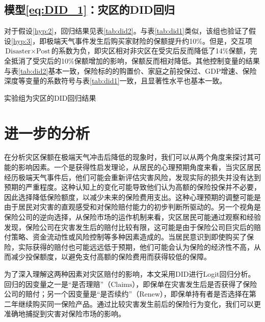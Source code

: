 
\subsection{模型\ref{eq:DID_1}：灾区的DID回归}
对于假设\ref{hyp:2}，回归结果见表\ref{tab:did2}。与表\ref{tab:did1}类似，该组也验证了假设\ref{hyp:3}，即极端天气事件发生后购买家财险的保额提升约10\%。但是，交互项$\text{Disaster}\times \text{Post}$的系数为负，即灾区相对非灾区在受灾后反而降低了14\%保额，完全抵消了受灾后的10\%保额增加的影响，保额反而相对降低。其他控制变量的结果与表\ref{tab:did2}基本一致，保险标的的购置价、家庭之前投保过、GDP增速、保险深度等变量的系数符号与表\ref{tab:did1}一致，且显著性水平也基本一致。
\begin{table}[H]
    \centering
    \caption{实验组为灾区的DID回归结果}\label{tab:did2}
    
\end{table}

\section{进一步的分析}

在分析灾区保额在极端天气冲击后降低的现象时，我们可以从两个角度来探讨其可能的影响因素。一个是获得性启发理论\citep{0Do}，从居民的心理预期角度来看，当灾区居民经历极端天气事件后，他们可能会重新评估灾害风险，发现实际的损失并没有达到预期的严重程度。这种认知上的变化可能导致他们认为高额的保险投保并不必要，因此选择降低保险额度，以减少未来的保险费用支出。这种心理预期的调整可能是由于居民对灾害的直观感受和对保险赔付能力的初步判断所驱动的。另一个视角是保险公司的逆向选择，从保险市场的运作机制来看，灾区居民可能通过观察和经验发现，保险公司在灾害发生后的赔付比较有限，这可能是由于保险公司巨灾后的赔付策略、资金流动性或风险控制等多种因素造成的\citep{田玲2009中国财产保险业巨灾损失赔付能力实证研究}。当居民意识到即使购买了保险，实际获得的赔付也可能远远低于预期，他们可能会认为保险的经济性不高，从而减少投保额度，以避免支付高额的保险费用而获得较低的保障。

为了深入理解这两种因素对灾区赔付的影响，本文采用DID进行Logit回归分析。回归的因变量之一是“是否理赔”（$\text{Claims}$），即保单在灾害发生后是否获得了保险公司的赔付；另一个因变量是“是否续约”（$\text{Renew}$），即保单持有者是否选择在第二年继续购买同一保险产品。通过比较灾害发生前后的保险行为变化，我们可以更准确地捕捉到灾害对保险市场的影响。

